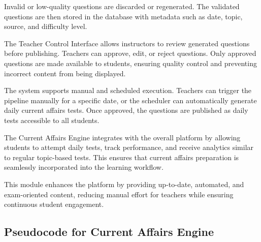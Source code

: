 \begin{sloppypar}
Invalid or low-quality questions are discarded or regenerated. The validated questions are then stored in the database with metadata such as date, topic, source, and difficulty level.

The Teacher Control Interface allows instructors to review generated questions before publishing. Teachers can approve, edit, or reject questions. Only approved questions are made available to students, ensuring quality control and preventing incorrect content from being displayed.

The system supports manual and scheduled execution. Teachers can trigger the pipeline manually for a specific date, or the scheduler can automatically generate daily current affairs tests. Once approved, the questions are published as daily tests accessible to all students.

The Current Affairs Engine integrates with the overall platform by allowing students to attempt daily tests, track performance, and receive analytics similar to regular topic-based tests. This ensures that current affairs preparation is seamlessly incorporated into the learning workflow.

This module enhances the platform by providing up-to-date, automated, and exam-oriented content, reducing manual effort for teachers while ensuring continuous student engagement.

\subsection{Pseudocode for Current Affairs Engine}


\end{sloppypar}
